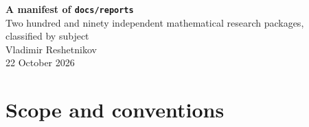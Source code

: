 \documentclass[11pt]{article}
\begin{document}
\begin{center}
  {\LARGE\bfseries\color{Ink} A manifest of \texttt{docs/reports}}\\[0.6em]
  {\large Two hundred and ninety independent mathematical research packages,\\
   classified by subject}\\[1.0em]
  {\normalsize Vladimir Reshetnikov}\\[0.3em]
  {\normalsize 22 October 2026}
\end{center}

\vspace{0.8em}

\section{Scope and conventions}
\end{document}
